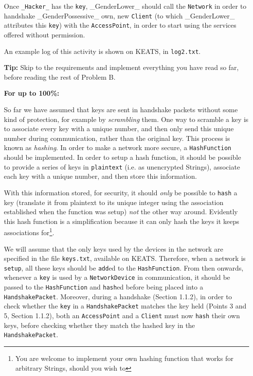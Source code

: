 \documentclass[11pt]{article}
\begin{document}
Once \texttt{_Hacker_} has the \texttt{key}, _GenderLower_ should call the \texttt{Network} in order to handshake _GenderPossessive_  own, new \texttt{Client} (to which _GenderLower_ attributes this \texttt{key}) with the \texttt{AccessPoint}, in order to start using the services offered without permission.

An example log of this activity is shown on KEATS, in \texttt{log2.txt}.

\textbf{Tip:} Skip to the requirements and implement everything you have read so far, before reading the rest of Problem B.

\textbf{For up to 100\%:}

So far we have assumed that keys are sent in handshake packets without some kind of protection, for example by \emph{scrambling} them. One way to scramble a key is to associate every key with a unique number, and then only send this unique number during communication, rather than the original key. This process is known as \emph{hashing}. In order to make a network more secure, a \texttt{HashFunction} should be implemented. In order to setup a hash function, it should be possible to provide a series of keys in \texttt{plaintext} (i.e. as unencrypted Strings), associate each key with a unique number, and then store this information. 

With this information stored, for security, it should \emph{only} be possible to \texttt{hash} a key (translate it from plaintext to its unique integer using the association established when the function was setup) \emph{not} the other way around. Evidently this hash function is a simplification because it can only hash the keys it keeps associations for\footnote{You are welcome to implement your own hashing function that works for arbitrary Strings, should you wish to}.

We will assume that the only keys used by the devices in the network are specified in the file \texttt{keys.txt}, available on KEATS. Therefore, when a network is \texttt{setup}, all these keys should be \texttt{add}ed to the \texttt{HashFunction}. From then onwards, whenever a \texttt{key} is used by a \texttt{NetworkDevice} in communication, it should be passed to the \texttt{HashFunction} and \texttt{hash}ed before being placed into a \texttt{HandshakePacket}. Moreover, during a handshake (Section 1.1.2), in order to check whether the \texttt{key} in a \texttt{HandshakePacket} matches the key held (Points 3 and 5, Section 1.1.2), both an \texttt{AccessPoint} and a \texttt{Client} must now \texttt{hash} their own keys, before checking whether they match the hashed key in the \texttt{HandshakePacket}.
\end{document}
